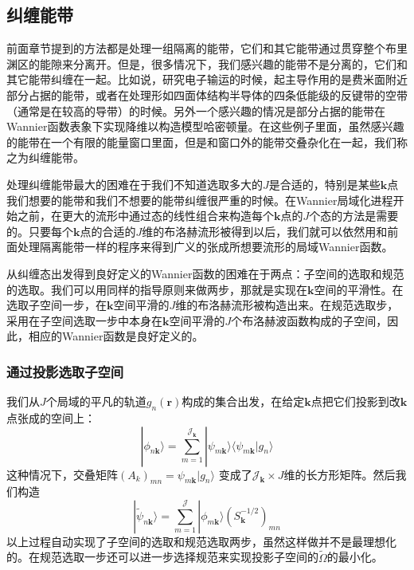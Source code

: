 \subsection{纠缠能带}
前面章节提到的方法都是处理一组隔离的能带，它们和其它能带通过贯穿整个布里渊区的能隙来分离开。但是，很多情况下，我们感兴趣的能带不是分离的，它们和其它能带纠缠在一起。比如说，研究电子输运的时候，起主导作用的是费米面附近部分占据的能带，或者在处理形如四面体结构半导体的四条低能级的反键带的空带（通常是在较高的导带）的时候。另外一个感兴趣的情况是部分占据的能带在Wannier函数表象下实现降维以构造模型哈密顿量。在这些例子里面，虽然感兴趣的能带在一个有限的能量窗口里面，但是和窗口外的能带交叠杂化在一起，我们称之为纠缠能带。

处理纠缠能带最大的困难在于我们不知道选取多大的$J$是合适的，特别是某些$\bm{k}$点我们想要的能带和我们不想要的能带纠缠很严重的时候。在Wannier局域化进程开始之前，在更大的流形中通过态的线性组合来构造每个$\bm{k}$点的$J$个态的方法是需要的。只要每个$\bm{k}$点的合适的$J$维的布洛赫流形被得到以后，我们就可以依然用和前面处理隔离能带一样的程序来得到广义的张成所想要流形的局域Wannier函数。

从纠缠态出发得到良好定义的Wannier函数的困难在于两点：子空间的选取和规范的选取。我们可以用同样的指导原则来做两步，那就是实现在$\bm{k}$空间的平滑性。在选取子空间一步，在$\bm{k}$空间平滑的$J$维的布洛赫流形被构造出来。在规范选取步，采用在子空间选取一步中本身在$\bm{k}$空间平滑的$J$个布洛赫波函数构成的子空间，因此，相应的Wannier函数是良好定义的。

\subsubsection{通过投影选取子空间}
我们从$J$个局域的平凡的轨道$g_n(\bm{r})$构成的集合出发，在给定$\bm{k}$点把它们投影到改$\bm{k}$点张成的空间上：
\begin{equation}
|\phi_{n\bm{k}} \rangle=\sum_{m=1}^{\mathcal{J}_{\bm{k}}}|\psi_{m\bm{k}} \rangle \langle\psi_{m\bm{k}}|g_n \rangle
\end{equation}
这种情况下，交叠矩阵$(A_k)_{mn}=\psi_{m\bm{k}}|g_n \rangle$ 变成了$\mathcal{J}_{\bm{k}} \times J $维的长方形矩阵。然后我们构造
\begin{equation}
|\widetilde\psi_{n\bm{k}}\rangle=\sum_{m=1}^{\mathcal{J}}|\phi_{m\bm{k}} \rangle(S^{-1/2}_{\bm{k}})_{mn}
\end{equation}
以上过程自动实现了子空间的选取和规范选取两步，虽然这样做并不是最理想化的。在规范选取一步还可以进一步选择规范来实现投影子空间的$\widetilde \Omega$的最小化。

